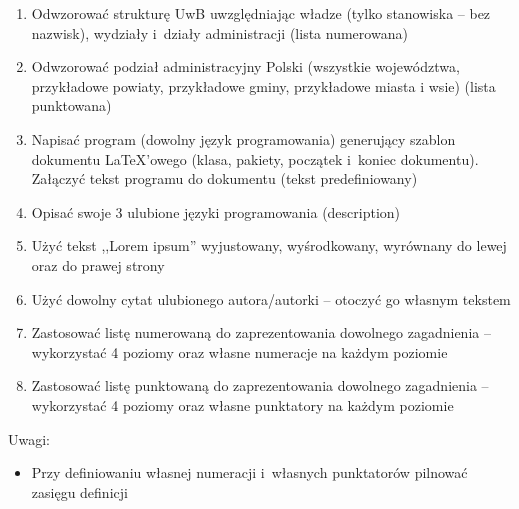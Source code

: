 \documentclass[a4paper,12pt]{article}
\begin{document}
\begin{enumerate}
    \item Odwzorować strukturę UwB uwzględniając władze (tylko stanowiska -- bez nazwisk), wydziały i~działy administracji (lista numerowana)
    \item Odwzorować podział administracyjny Polski (wszystkie województwa, przykładowe powiaty, przykładowe gminy, przykładowe miasta i wsie) (lista punktowana)
    \item Napisać program (dowolny język programowania) generujący szablon dokumentu \LaTeX'owego (klasa, pakiety, początek i~koniec dokumentu). Załączyć tekst programu do dokumentu (tekst predefiniowany)
    \item Opisać swoje 3 ulubione języki programowania (description)
    \item Użyć tekst ,,Lorem ipsum'' wyjustowany, wyśrodkowany, wyrównany do lewej oraz do prawej strony
    \item Użyć dowolny cytat ulubionego autora/autorki -- otoczyć go własnym tekstem
    \item Zastosować listę numerowaną do zaprezentowania dowolnego zagadnienia -- wykorzystać 4 poziomy oraz własne numeracje na każdym poziomie
    \item Zastosować listę punktowaną do zaprezentowania dowolnego zagadnienia -- wykorzystać 4 poziomy oraz własne punktatory na każdym poziomie
\end{enumerate}

Uwagi:

\begin{itemize}
    \item Przy definiowaniu własnej numeracji i~własnych punktatorów pilnować zasięgu definicji
\end{itemize}
\end{document}
